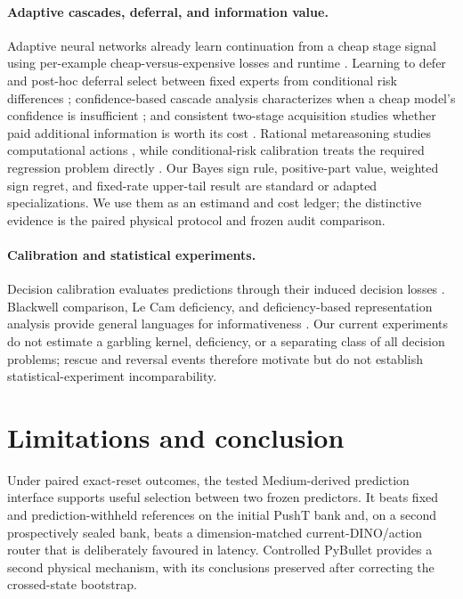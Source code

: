 \documentclass[10pt]{article}
\theoremstyle{definition}
\theoremstyle{remark}
\begin{document}
\paragraph{Adaptive cascades, deferral, and information value.}
Adaptive neural networks already learn continuation from a cheap stage signal
using per-example cheap-versus-expensive losses and runtime
\citep{bolukbasi2017adaptive}.  Learning to defer and post-hoc deferral select
between fixed experts from conditional risk differences
\citep{mozannar2020consistent,narasimhan2022posthoc}; confidence-based cascade
analysis characterizes when a cheap model's confidence is insufficient
\citep{jitkrittum2023confidence}; and consistent two-stage acquisition studies
whether paid additional information is worth its cost
\citep{regol2025acquisition}.  Rational metareasoning studies computational
actions \citep{russell1991principles}, while conditional-risk calibration
treats the required regression problem directly
\citep{vasilyev2026conditional}.  Our Bayes sign rule, positive-part value,
weighted sign regret, and fixed-rate upper-tail result are standard or adapted
specializations.  We use them as an estimand and cost ledger; the distinctive
evidence is the paired physical protocol and frozen audit comparison.

\paragraph{Calibration and statistical experiments.}
Decision calibration evaluates predictions through their induced decision
losses \citep{zhao2021calibrating,zhao2021right}.  Blackwell comparison, Le Cam
deficiency, and deficiency-based representation analysis provide general
languages for informativeness
\citep{blackwell1953equivalent,lecam2000asymptotics,
vanrooyen2014lecam,banerjee2018variational}.  Our current experiments
do not estimate a garbling kernel, deficiency, or a separating class of all
decision problems; rescue and reversal events therefore motivate but do not
establish statistical-experiment incomparability.

\section{Limitations and conclusion}

Under paired exact-reset outcomes, the tested Medium-derived prediction
interface supports useful selection between two frozen predictors.  It beats
fixed and prediction-withheld references on the initial PushT bank and, on a
second prospectively sealed bank, beats a dimension-matched current-DINO/action
router that is deliberately favoured in latency.  Controlled PyBullet provides
a second physical mechanism, with its conclusions preserved after correcting
the crossed-state bootstrap.
\end{document}
